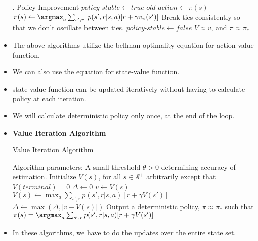 \documentclass[a4paper]{article}
\begin{document}
\begin{itemize}
\begin{algorithm}[H]
\begin{algorithmic}[1]
                    \EndFor
                \Until{$\Delta<\theta$}
                \Statex
                . Policy Improvement
                \State $policy\text{-}stable\gets true$
                    \State $old\text{-}action\gets \pi(s)$
                    \State $\pi(s)\gets \argmax_a\sum_{s',r}|p(s',r|s,a)[r+\gamma v_\pi(s')]$
                    \LComment Break ties consistently so that we don't oscillate between ties.
                        \State $policy\text{-}stable\gets false$
                    \EndIf
                \EndFor
                    \State \Return $V\approx v$, and $\pi \approx \pi_*$
                \EndIf
            \EndLoop
        \end{algorithmic}
    \end{algorithm}
    \item The above algorithms utilize the bellman optimality equation for action-value function.
    \item We can also use the equation for state-value function.
    \item state-value function can be updated iteratively without having to calculate policy at each iteration.
    \item We will calculate deterministic policy only once, at the end of the loop.
    \item \textbf{Value Iteration Algorithm}
    \begin{algorithm}[H]
        \caption{Value Iteration Algorithm}
        \begin{algorithmic}[1]
            \Statex Algorithm parameters: A small threshold $\theta>0$ determining accuracy of estimation.
            \Statex Initialize $V(s)$, for all $s\in \mathcal{S}^+$ arbitrarily except that $V(terminal)=0$
            \Repeat
                \State $\Delta \gets 0$
                    \State $v\gets V(s)$
                    \State $V(s)\gets \max_a{\sum_{s',r}p(s',r|s,a)[r+\gamma V(s')]}$
                    \State $\Delta \gets \max{(\Delta,\lvert v-V(s)\rvert)}$
                \EndFor
            \Until{$\Delta<\theta$}
            \Statex Output a deterministic policy, $\pi \approx \pi_*$ such that
            \State $\pi(s)=\argmax_a\sum_{s',r}p(s',r|s,a)[r+\gamma V(s')]$
        \end{algorithmic}
    \end{algorithm}
    \item In these algorithms, we have to do the updates over the entire state set.
\end{itemize}
\end{document}

